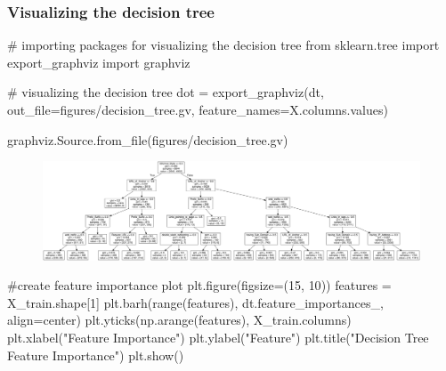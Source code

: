\documentclass[
  letterpaper,
  DIV=11,
  numbers=noendperiod]{scrartcl}
\newenvironment{Shaded}{\begin{snugshade}}{\end{snugshade}}
\newcommand{\BuiltInTok}[1]{\textcolor[rgb]{0.00,0.23,0.31}{#1}}
\newcommand{\CommentTok}[1]{\textcolor[rgb]{0.37,0.37,0.37}{#1}}
\newcommand{\DecValTok}[1]{\textcolor[rgb]{0.68,0.00,0.00}{#1}}
\newcommand{\ImportTok}[1]{\textcolor[rgb]{0.00,0.46,0.62}{#1}}
\newcommand{\NormalTok}[1]{\textcolor[rgb]{0.00,0.23,0.31}{#1}}
\newcommand{\OperatorTok}[1]{\textcolor[rgb]{0.37,0.37,0.37}{#1}}
\newcommand{\StringTok}[1]{\textcolor[rgb]{0.13,0.47,0.30}{#1}}
\begin{document}
\hypertarget{visualizing-the-decision-tree}{%
\subsubsection{Visualizing the decision
tree}\label{visualizing-the-decision-tree}}

\begin{Shaded}
\begin{Highlighting}[]
\CommentTok{\# importing packages for visualizing the decision tree}
\ImportTok{from}\NormalTok{ sklearn.tree }\ImportTok{import}\NormalTok{ export\_graphviz}
\ImportTok{import}\NormalTok{ graphviz}

\CommentTok{\# visualizing the decision tree}
\NormalTok{dot }\OperatorTok{=}\NormalTok{ export\_graphviz(dt, out\_file}\OperatorTok{=}\StringTok{\textquotesingle{}figures/decision\_tree.gv\textquotesingle{}}\NormalTok{, feature\_names}\OperatorTok{=}\NormalTok{X.columns.values)}
\end{Highlighting}
\end{Shaded}

\begin{Shaded}
\begin{Highlighting}[]
\NormalTok{graphviz.Source.from\_file(}\StringTok{\textquotesingle{}figures/decision\_tree.gv\textquotesingle{}}\NormalTok{)}
\end{Highlighting}
\end{Shaded}

\begin{figure}[H]

{\centering \includegraphics{project_files/figure-pdf/cell-17-output-1.svg}

}

\end{figure}

\begin{Shaded}
\begin{Highlighting}[]
\CommentTok{\#create feature importance plot}
\NormalTok{plt.figure(figsize}\OperatorTok{=}\NormalTok{(}\DecValTok{15}\NormalTok{, }\DecValTok{10}\NormalTok{))}
\NormalTok{features }\OperatorTok{=}\NormalTok{ X\_train.shape[}\DecValTok{1}\NormalTok{]}
\NormalTok{plt.barh(}\BuiltInTok{range}\NormalTok{(features), dt.feature\_importances\_, align}\OperatorTok{=}\StringTok{\textquotesingle{}center\textquotesingle{}}\NormalTok{)}
\NormalTok{plt.yticks(np.arange(features), X\_train.columns)}
\NormalTok{plt.xlabel(}\StringTok{"Feature Importance"}\NormalTok{)}
\NormalTok{plt.ylabel(}\StringTok{"Feature"}\NormalTok{)}
\NormalTok{plt.title(}\StringTok{"Decision Tree Feature Importance"}\NormalTok{)}
\NormalTok{plt.show()}
\end{Highlighting}
\end{Shaded}
\end{document}
